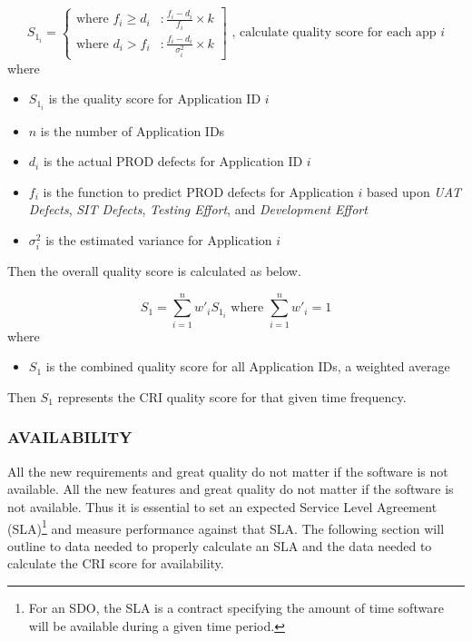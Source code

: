 \documentclass[SDSUThesis.tex]{subfiles}
\begin{document}
                \begin{displaymath}
                   S_{1_i} = \left\{
                     \begin{array}{lr}
                       \text{where } f_i \geq d_i & :  \frac{f_i - d_i}{f_i} \times k  \\
                       \text{where } d_i > f_i  & : \frac{f_i-d_i }{\sigma_i^2} \times k
                     \end{array}
                   \right] \text{   , calculate quality score for each app $i$}
                \end{displaymath} 
                where
                \begin{itemize}
                    \item $S_{1_i}$ is the quality score for Application ID $i$
                    \item $n$ is the number of Application IDs
                    \item $d_i$ is the actual PROD defects for Application ID $i$
                    \item $f_i$ is the function to predict PROD defects for Application $i$ based upon 
                        \textit{UAT Defects}, \textit{SIT Defects}, \textit{Testing Effort}, 
                        and \textit{Development Effort}
                    \item $\sigma_i^2$ is the estimated variance for Application $i$
                \end{itemize}
                
                Then the overall quality score is calculated as below.
                
                \[
                    S_{1} = \sum\limits^n_{i=1} w'_i S_{1_i} \text{ where } \sum\limits^n_{i=1} w'_i = 1
                \]
                where
                \begin{itemize}
                    \item $S_1$ is the combined quality score for all Application IDs, 
                    a weighted average
                \end{itemize}
                
                Then $S_1$ represents the CRI quality score for that given time 
                frequency.
        


        \subsubsection{AVAILABILITY}
            All the new requirements and great quality do not matter if the software is not available.
            All the new features and great quality do not matter if the software is not available.  Thus it
            is essential to set an expected Service Level Agreement (SLA)\footnote{For an SDO, the SLA is a 
            contract specifying the amount of time software will be available during a
            given time period. } and measure 
            performance against that SLA.  The following section will outline to data needed to properly
            calculate an SLA and the data needed to calculate the CRI score for availability.
            
\end{document}
